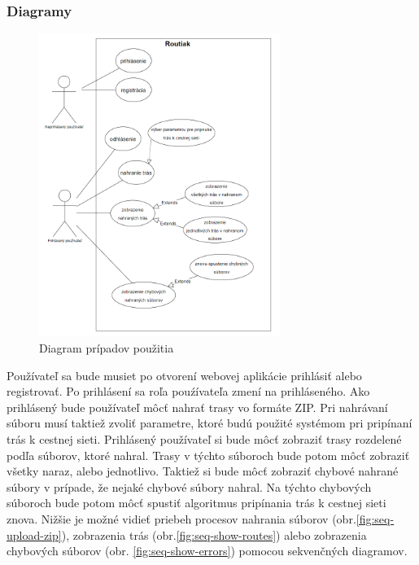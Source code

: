 \subsubsection{Diagramy}
\begin{figure}[H]
    \centering
    \includegraphics[width=0.7\textwidth]{img/diagramy/use-case.png}
    \caption{Diagram prípadov použitia}
    \label{fig:use-case}
\end{figure}
\indent \indent Používateľ sa bude musiet po otvorení webovej aplikácie prihlásiť alebo registrovať. Po prihlásení sa roľa pouźívateľa zmení na prihláseného. Ako prihlásený bude používateľ môcť nahrať trasy vo formáte ZIP. Pri nahrávaní súboru musí taktiež zvoliť parametre, ktoré budú použité systémom pri pripínaní trás k cestnej sieti. Prihlásený používateľ si bude môcť zobraziť trasy rozdelené podľa súborov, ktoré nahral. Trasy v týchto súboroch bude potom môcť zobraziť všetky naraz, alebo jednotlivo. Taktiež si bude môcť zobraziť chybové nahrané súbory v prípade, že nejaké chybové súbory nahral. Na týchto chybových súboroch bude potom môcť spustiť algoritmus pripínania trás k cestnej sieti znova. Nižšie je možné vidieť priebeh procesov nahrania súborov (obr.\ref{fig:seq-upload-zip}), zobrazenia trás (obr.\ref{fig:seq-show-routes}) alebo zobrazenia chybových súborov (obr. \ref{fig:seq-show-errors}) pomocou sekvenčných diagramov.
